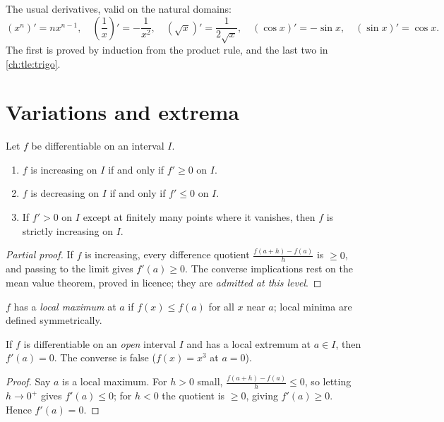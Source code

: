 \begin{example}
The usual derivatives, valid on the natural domains:
\[
(x^n)' = nx^{n-1}, \quad
\left(\frac{1}{x}\right)' = -\frac{1}{x^2}, \quad
(\sqrt{x})' = \frac{1}{2\sqrt{x}}, \quad
(\cos x)' = -\sin x, \quad
(\sin x)' = \cos x .
\]
The first is proved by induction from the product rule, and the last two in
\cref{ch:tle:trigo}.
\end{example}

\section{Variations and extrema}

\begin{theorem}\label{thm:tle:deriv:variations}
Let $f$ be differentiable on an interval $I$.
\begin{enumerate}
  \item $f$ is increasing on $I$ if and only if $f' \geq 0$ on $I$.
  \item $f$ is decreasing on $I$ if and only if $f' \leq 0$ on $I$.
  \item If $f' > 0$ on $I$ except at finitely many points where it
        vanishes, then $f$ is strictly increasing on $I$.
\end{enumerate}
\end{theorem}

\begin{proof}[Partial proof]
If $f$ is increasing, every difference quotient
$\frac{f(a+h)-f(a)}{h}$ is $\geq 0$, and passing to the limit gives
$f'(a) \geq 0$. The converse implications rest on the mean value theorem,
proved in licence; they are \emph{admitted at this level}.
\end{proof}

\begin{definition}\label{def:tle:deriv:extremum}
$f$ has a \emph{local maximum} at $a$ if $f(x) \leq f(a)$ for
all $x$ near $a$; local minima are defined symmetrically.
\end{definition}

\begin{proposition}\label{prop:tle:deriv:critical}
If $f$ is differentiable on an \emph{open} interval $I$ and has a local
extremum at $a \in I$, then $f'(a) = 0$. The converse is false
($f(x) = x^3$ at $a = 0$).
\end{proposition}

\begin{proof}
Say $a$ is a local maximum. For $h > 0$ small,
$\frac{f(a+h)-f(a)}{h} \leq 0$, so letting $h \to 0^+$ gives $f'(a) \leq 0$;
for $h < 0$ the quotient is $\geq 0$, giving $f'(a) \geq 0$. Hence
$f'(a) = 0$.
\end{proof}

